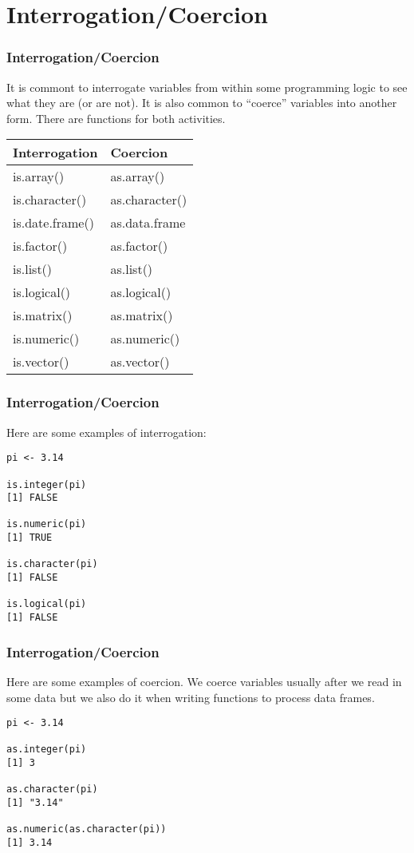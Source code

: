 \documentclass{beamer}
\begin{document}
\section{Interrogation/Coercion}
\begin{frame}[fragile]
\frametitle{Interrogation/Coercion}
It is commont to interrogate variables from within some programming logic to see what they are (or are not). It is also common to ``coerce'' variables into another form. There are functions for both activities.
\newline
\begin{center}
\begin{tabular}{| l | l | }
  \hline         
  Interrogation & Coercion \\ \hline
  is.array() & as.array() \\ 
  is.character() & as.character() \\ 
  is.date.frame() & as.data.frame \\ 
  is.factor() & as.factor() \\ 
  is.list() & as.list() \\ 
  is.logical() & as.logical() \\ 
  is.matrix() & as.matrix() \\
  is.numeric() & as.numeric() \\ 
  is.vector() & as.vector() \\
  \hline  
\end{tabular}
\end{center}
\end{frame}

\begin{frame}[fragile]
\frametitle{Interrogation/Coercion}
Here are some examples of interrogation:
\begin{verbatim}
pi <- 3.14

is.integer(pi)
[1] FALSE

is.numeric(pi)
[1] TRUE

is.character(pi)
[1] FALSE

is.logical(pi)
[1] FALSE
\end{verbatim}
\end{frame}

\begin{frame}[fragile]
\frametitle{Interrogation/Coercion}
Here are some examples of coercion. We coerce variables usually after we read in some data but we also do it when writing functions to process data frames.
\newline
\begin{verbatim}
pi <- 3.14

as.integer(pi)
[1] 3

as.character(pi)
[1] "3.14"

as.numeric(as.character(pi))
[1] 3.14
\end{verbatim}
\end{frame}
\end{document}
